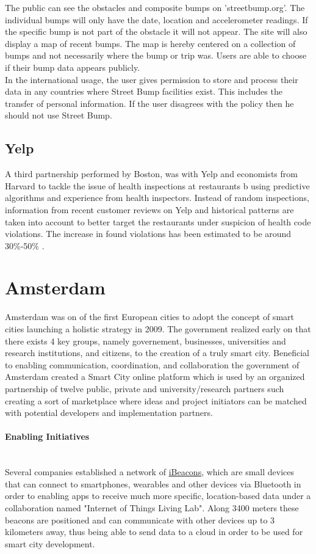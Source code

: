 \documentclass[a4paper,12pt]{report}
\begin{document}
			The public can see the obstacles and composite bumps on 'streetbump.org'. The individual bumps will only have the date, location and accelerometer readings. If the specific bump is not part of the obstacle it will not appear.  The site will also display a map of recent bumps. The map is hereby centered on a collection of bumps and not necessarily where the bump or trip was. Users are able to choose if their bump data appears publicly.\\
			In the international usage, the user gives permission to store and process their data in any countries where Street Bump facilities exist. This includes the transfer of personal information. If the user disagrees with the policy then he should not use Street Bump.
		\closesection	
		\subsection[Yelp]{Yelp \cite{YelpBoston}}
		\startsubsection
			A third partnership performed by Boston, was with Yelp and economists from Harvard to tackle the issue of health inspections at restaurants b using predictive algorithms and experience from health inspectors.
			Instead of random inspections, information from recent customer reviews on Yelp and historical patterns are taken into account to better target the restaurants under suspicion of health code violations. The increase in found violations has been estimated to be around 30\%-50\% \cite{BSL16} \cite{Gla16}.
		\closesection
	\closesection
	
	\section[Amsterdam]{Amsterdam \cite{SmartCityAmsterdam}} \label{Amsterdam}
	\startsection
		Amsterdam was on of the first European cities to adopt the concept of smart cities launching a holistic strategy in 2009. The government realized early on that there exists 4 key groups, namely governement, businesses, universities and research institutions, and citizens, to the creation of a truly smart city. Beneficial to enabling communication, coordination, and collaboration the government of Amsterdam created a Smart City online platform which is used by an organized partnership of twelve public, private and university/research partners such creating a sort of marketplace where ideas and project initiators can be matched with potential developers and implementation partners.
		\paragraph{Enabling Initiatives} \hfill \\
		Several companies established a network of \href{https://www.yenlo.com/blogs/ibeacon-testing-ground-first-lora-network/}{iBeacons}, which are small devices that can connect to smartphones, wearables and other devices via Bluetooth in order to enabling apps to receive much more specific, location-based data under a collaboration named "Internet of Things Living Lab". Along 3400 meters these beacons are positioned and can communicate with other devices up to 3 kilometers away, thus being able to send data to a cloud in order to be used for smart city development.
\end{document}
